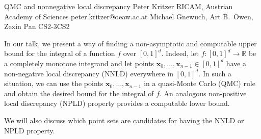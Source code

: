 \begin{talk}
  {QMC and nonnegative local discrepancy}%
  {Peter Kritzer}%
  {RICAM, Austrian Academy of Sciences}%
  {peter.kritzer@oeaw.ac.at}%
  {Michael Gnewuch, Art B.~Owen, Zexin Pan}%
{}{}{CS2-3}{CS2}

			
In our talk, we present a way of finding a  non-asymptotic and 
computable upper bound for the integral of a function $f$ over $[0,1]^d$. 		Indeed, let $f:[0,1]^d\to\mathbb{R}$ be a completely monotone integrand
and let points $\boldsymbol{x}_0,\dots,\boldsymbol{x}_{n-1}\in[0,1]^d$
have a non-negative local discrepancy (NNLD) everywhere
in $[0,1]^d$. In such a situation, we can use the points 
$\boldsymbol{x}_0,\dots,\boldsymbol{x}_{n-1}$ in a quasi-Monte Carlo (QMC) rule 
and obtain the desired bound for the integral of $f$. 
An analogous non-positive local
discrepancy (NPLD) property provides a computable lower
bound.

We will also discuss which point sets are candidates 
for having the NNLD or NPLD property.


\end{talk}

